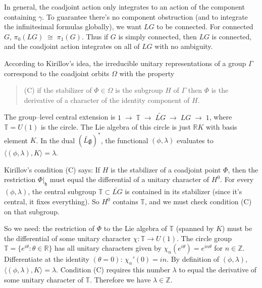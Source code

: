 \documentclass[12pt]{article}
\begin{document}
\begin{remark}
    In general, the coadjoint action only integrates to an action of the component containing $\gamma$. To guarantee there's no component obstruction (and to integrate the infinitesimal formulas globally), we want $LG$ to be connected. For connected $G$, $\pi_0(LG)\;\cong\;\pi_1(G)$. Thus if $G$ is simply connected, then $LG$ is connected, and the coadjoint action integrates on all of $LG$ with no ambiguity.
\end{remark}


According to Kirillov's idea, the irreducible unitary representations of a
group $\Gamma$ correspond to the coadjoint orbits $\Omega$ with the property

\begin{quote}
    (C) if the stabilizer of $\Phi \in \Omega$ is the subgroup $H$ of $\Gamma$
    then $\Phi$ is the derivative of a character of the identity component of $H$.
\end{quote}

The group--level central extension is
$1 \;\to\; \mathbb T \;\to\; \widetilde{LG} \;\to\; LG \;\to\; 1$,
where $\mathbb T = U(1)$ is the circle. The Lie algebra of this circle is just $\mathbb R K$ with basis element $K$. In the dual $(\widetilde{L\mathfrak g})^*$, the functional $(\phi,\lambda)$ evaluates to
$\langle (\phi,\lambda), K \rangle = \lambda$.


Kirillov's condition (C) says:
If $H$ is the stabilizer of a coadjoint point $\Phi$, then the restriction $\Phi|_{\mathfrak h}$ must equal the differential of a unitary character of $H^0$. For every $(\phi,\lambda)$, the central subgroup $\mathbb T \subset \widetilde{LG}$ is contained in its stabilizer (since it's central, it fixes everything). So $H^0$ contains $\mathbb T$, and we must check condition (C) on that subgroup.

So we need: the restriction of $\Phi$ to the Lie algebra of $\mathbb T$ (spanned by $K$) must be the differential of some unitary character $\chi:\mathbb T\to U(1)$. The circle group $\mathbb T = \{ e^{i\theta} : \theta\in\mathbb R \}$ has all unitary characters given by $\chi_n(e^{i\theta}) = e^{in\theta}$ for $n\in\mathbb Z$. Differentiate at the identity $(\theta=0)$: $\chi_n'(0) = in$. By definition of $(\phi,\lambda)$,
$\langle (\phi,\lambda),K\rangle = \lambda$. Condition (C) requires this number $\lambda$ to equal the derivative of some unitary character of $\mathbb T$. Therefore we have $\lambda \in \mathbb Z$.
\end{document}
